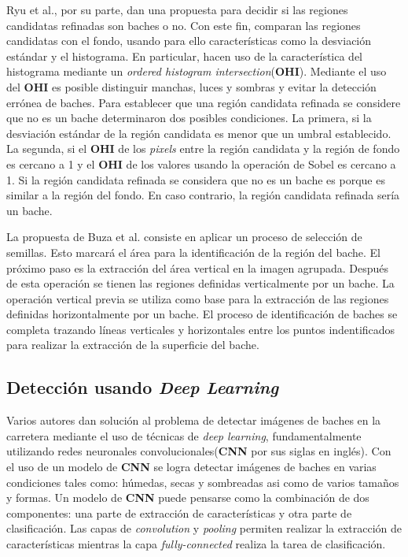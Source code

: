 		Ryu et al., por su parte, dan una propuesta para decidir si las regiones candidatas refinadas son baches o no. Con este fin, 
		comparan las regiones candidatas con el fondo, usando para ello características como la desviación estándar y el histograma. En particular, hacen 
		uso de la característica del histograma mediante un \emph{ordered histogram intersection}(\textbf{OHI}). Mediante el uso del \textbf{OHI} es posible 
		distinguir manchas, luces y sombras y evitar la detección errónea de baches. Para establecer que una región candidata refinada se considere que no es un 
		bache determinaron dos posibles condiciones. La primera, si la desviación estándar de la región candidata es menor que un umbral establecido. La segunda, 
		si el \textbf{OHI} de los \emph{pixels} entre la región candidata y la región de fondo   es cercano a 1 y el \textbf{OHI} de los valores usando la operación 
		de Sobel es cercano a 1. Si la región candidata refinada se considera que no es un bache es porque es similar a la región del fondo. En caso contrario, 
		la región candidata refinada sería un bache.
		
		La propuesta de Buza et al. consiste en aplicar un proceso de selección de semillas. Esto marcará el área para la identificación 
		de la región del bache. El próximo paso es la extracción del área vertical en la imagen agrupada. Después de esta operación se tienen las regiones 
		definidas verticalmente por un bache. La operación vertical previa se utiliza como base para la extracción de las regiones definidas horizontalmente 
		por un bache. El proceso de identificación de baches se completa trazando líneas verticales y horizontales entre los puntos indentificados para 
		realizar la extracción de la superficie del bache.

	\subsection{Detección usando \emph{Deep Learning}}
	Varios autores dan solución al problema de detectar imágenes de baches en la carretera mediante el uso de técnicas 
	de \emph{deep learning}, fundamentalmente utilizando redes neuronales convolucionales(\textbf{CNN} por sus siglas en inglés). Con el uso 
	de un modelo de \textbf{CNN} se logra  detectar imágenes de baches en varias condiciones tales como: húmedas, secas y sombreadas asi como de varios 
	tamaños y formas. Un modelo de \textbf{CNN} puede pensarse como la combinación de dos componentes: una parte de extracción de características
	y otra parte de clasificación. Las capas de \emph{convolution} y \emph{pooling}  permiten realizar la extracción de características
	mientras la capa \emph{fully-connected} realiza la tarea de clasificación. 

